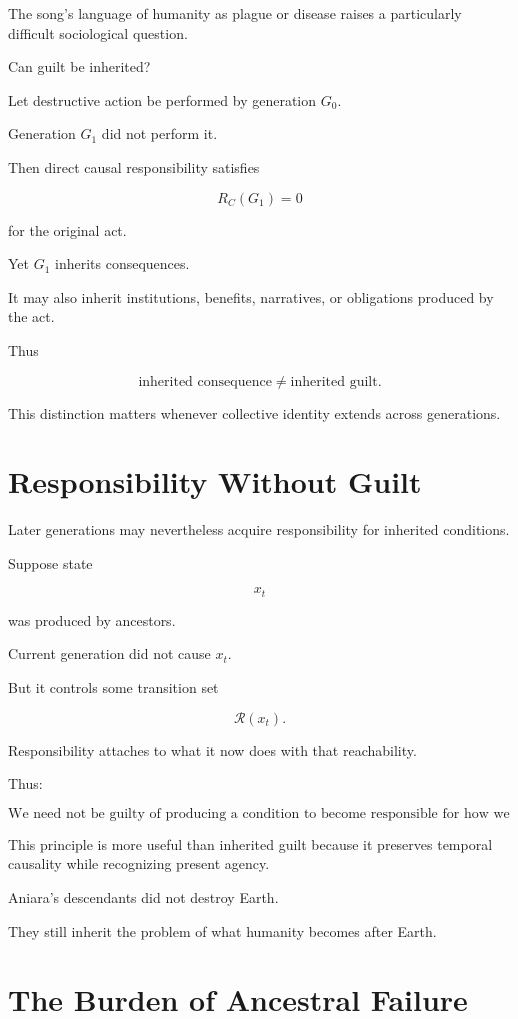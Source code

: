 \documentclass[11pt,oneside]{book}
\theoremstyle{definition}
\theoremstyle{remark}
\newcommand{\R}{\mathcal{R}}
\begin{document}
The song's language of humanity as plague or disease raises a particularly difficult sociological question.

Can guilt be inherited?

Let destructive action be performed by generation \(G_0\).

Generation \(G_1\) did not perform it.

Then direct causal responsibility satisfies

\[
R_C(G_1)=0
\]

for the original act.

Yet \(G_1\) inherits consequences.

It may also inherit institutions, benefits, narratives, or obligations produced by the act.

Thus

\[
\text{inherited consequence}
\neq
\text{inherited guilt}.
\]

This distinction matters whenever collective identity extends across generations.

\section{Responsibility Without Guilt}

Later generations may nevertheless acquire responsibility for inherited conditions.

Suppose state

\[
x_t
\]

was produced by ancestors.

Current generation did not cause \(x_t\).

But it controls some transition set

\[
\R(x_t).
\]

Responsibility attaches to what it now does with that reachability.

Thus:

\[
\boxed{
\text{We need not be guilty of producing a condition to become responsible for how we continue from it.}
}
\]

This principle is more useful than inherited guilt because it preserves temporal causality while recognizing present agency.

Aniara's descendants did not destroy Earth.

They still inherit the problem of what humanity becomes after Earth.

\section{The Burden of Ancestral Failure}
\end{document}
